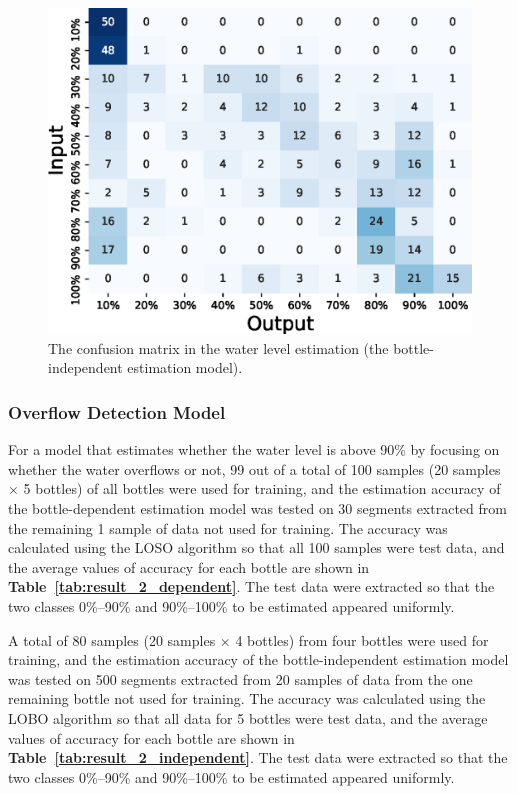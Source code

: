 \documentclass[sigconf]{acmart}
\newcommand\tabref[1]{\textbf{Table~\ref{tab:#1}}}
\begin{document}
\begin{figure}[!t]
\begin{minipage}[t]{0.32\linewidth}
    \includegraphics[width=0.9\linewidth]{figures/confusion_matrix_10_independent_tokkuri.eps}
  \end{minipage}
  \caption{The confusion matrix in the water level estimation (the bottle-independent estimation model).}
  \label{fig:confusion_matrix_10_independent}
\end{figure}

\subsubsection{Overflow Detection Model}
For a model that estimates whether the water level is above 90\% by focusing on whether the water overflows or not, 99 out of a total of 100 samples (20 samples $\times$ 5 bottles) of all bottles were used for training, and the estimation accuracy of the bottle-dependent estimation model was tested on 30 segments extracted from the remaining 1 sample of data not used for training. The accuracy was calculated using the LOSO algorithm so that all 100 samples were test data, and the average values of accuracy for each bottle are shown in \tabref{result_2_dependent}. The test data were extracted so that the two classes 0\%--90\% and 90\%--100\% to be estimated appeared uniformly.\par

A total of 80 samples (20 samples $\times$ 4 bottles) from four bottles were used for training, and the estimation accuracy of the bottle-independent estimation model was tested on 500 segments extracted from 20 samples of data from the one remaining bottle not used for training. The accuracy was calculated using the LOBO algorithm so that all data for 5 bottles were test data, and the average values of accuracy for each bottle are shown in \tabref{result_2_independent}. The test data were extracted so that the two classes 0\%--90\% and 90\%--100\% to be estimated appeared uniformly.\par
\end{document}
